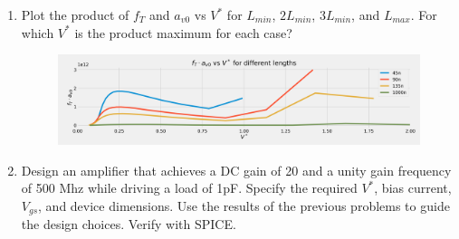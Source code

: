 \begin{enumerate}
\item {\color{blue}Plot the product of $f_T$ and $a_{v0}$ vs $V^*$ for $L_{min}$, $2 L_{min}$, $3 L_{min}$, and $L_{max}$. For which $V^*$ is the product maximum for each case?}

    \begin{figure}[H]
        \centering
        \includegraphics[width=\textwidth]{figs/problem11.png}
    \end{figure}

\item {\color{blue} Design an amplifier that achieves a DC gain of 20 and a unity gain frequency of 500 Mhz while driving a load of 1pF. Specify the required $V^*$, bias current, $V_{gs}$, and device dimensions. Use the results of the previous problems to guide the design choices. Verify with SPICE.}
\end{enumerate}

